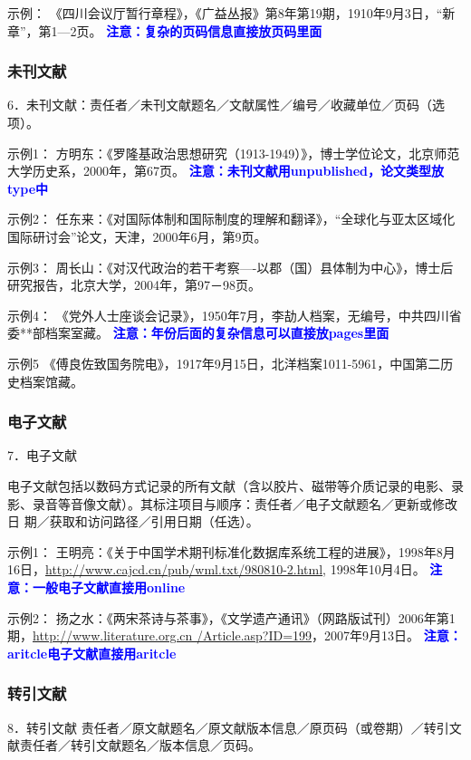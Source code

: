 \documentclass{article}
\newcommand{\qd}[1]{\textbf{\textcolor{blue}{#1}}}
\begin{document}
示例：
《四川会议厅暂行章程》，《广益丛报》第8年第19期，1910年9月3日，“新章”，第1—2页。
\qd{注意：复杂的页码信息直接放页码里面}



\subsubsection{未刊文献}
6．未刊文献：责任者／未刊文献题名／文献属性／编号／收藏单位／页码（选项）。

示例1：
方明东：《罗隆基政治思想研究（1913-1949）》，博士学位论文，北京师范大学历史系，2000年，第67页。
\qd{注意：未刊文献用unpublished，论文类型放type中}

示例2：
任东来：《对国际体制和国际制度的理解和翻译》，“全球化与亚太区域化国际研讨会”论文，天津，2000年6月，第9页。

示例3：
周长山：《对汉代政治的若干考察----以郡（国）县体制为中心》，博士后研究报告，北京大学，2004年，第97－98页。

示例4：
《党外人士座谈会记录》，1950年7月，李劼人档案，无编号，中共四川省委**部档案室藏。
\qd{注意：年份后面的复杂信息可以直接放pages里面}

示例5
《傅良佐致国务院电》，1917年9月15日，北洋档案1011-5961，中国第二历史档案馆藏。


\subsubsection{电子文献}

7．电子文献

电子文献包括以数码方式记录的所有文献（含以胶片、磁带等介质记录的电影、录影、录音等音像文献）。其标注项目与顺序：责任者／电子文献题名／更新或修改日
期／获取和访问路径／引用日期（任选）。

示例1：
王明亮：《关于中国学术期刊标准化数据库系统工程的进展》，1998年8月16日，\url{http://www.cajcd.cn/pub/wml.txt/980810-2.html}, 1998年10月4日。
\qd{注意：一般电子文献直接用online}

示例2：
扬之水：《两宋茶诗与茶事》，《文学遗产通讯》（网路版试刊）2006年第1期，\url{http://www.literature.org.cn /Article.asp?ID=199}，2007年9月13日。
\qd{注意：aritcle电子文献直接用aritcle}



\subsubsection{转引文献}
8．转引文献
责任者／原文献题名／原文献版本信息／原页码（或卷期）／转引文献责任者／转引文献题名／版本信息／页码。
\end{document}
